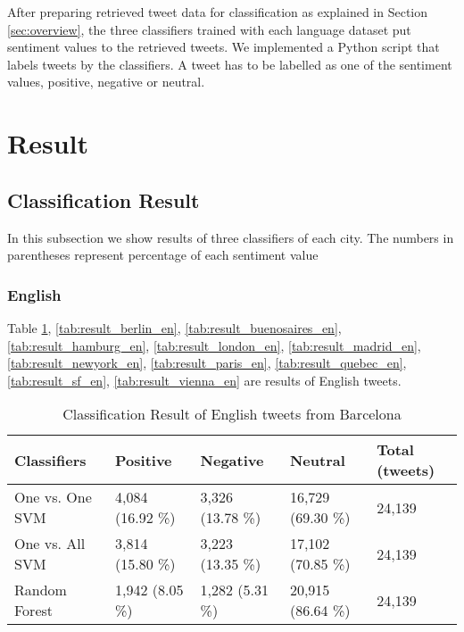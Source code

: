 After preparing retrieved tweet data for classification as explained in Section \ref{sec:overview}, the three classifiers trained with each language dataset put sentiment values to the retrieved tweets.
We implemented a Python script that labels tweets by the classifiers.
A tweet has to be labelled as one of the sentiment values, positive, negative or neutral.

\section{Result}\label{sec:result}
\subsection{Classification Result}
In this subsection we show results of three classifiers of each city.
The numbers in parentheses represent percentage of each sentiment value

\subsubsection{English}
Table \ref{tab:result_barcelona_en}, \ref{tab:result_berlin_en}, \ref{tab:result_buenosaires_en}, \ref{tab:result_hamburg_en}, \ref{tab:result_london_en}, \ref{tab:result_madrid_en}, \ref{tab:result_newyork_en}, \ref{tab:result_paris_en}, \ref{tab:result_quebec_en}, \ref{tab:result_sf_en}, \ref{tab:result_vienna_en} are results of English tweets.
\begin{table}[ht]
	\caption{Classification Result of English tweets from Barcelona}
	\begin{tabular}{|l|p{1.8cm}|p{1.8cm}|p{1.8cm}|p{1.8cm}|} \hline
	Classifiers & Positive & Negative & Neutral & Total (tweets)\\ \hline
	One vs. One SVM & 4,084 (16.92 \%) & 3,326 (13.78 \%) & 16,729 (69.30 \%) & 24,139\\ \hline
	One vs. All SVM & 3,814 (15.80 \%) & 3,223 (13.35 \%) & 17,102 (70.85 \%) & 24,139  \\ \hline
	Random Forest & 1,942 (8.05 \%) & 1,282 (5.31 \%) & 20,915 (86.64 \%) & 24,139 \\ \hline
	\end{tabular}
	\label{tab:result_barcelona_en}
\end{table}

